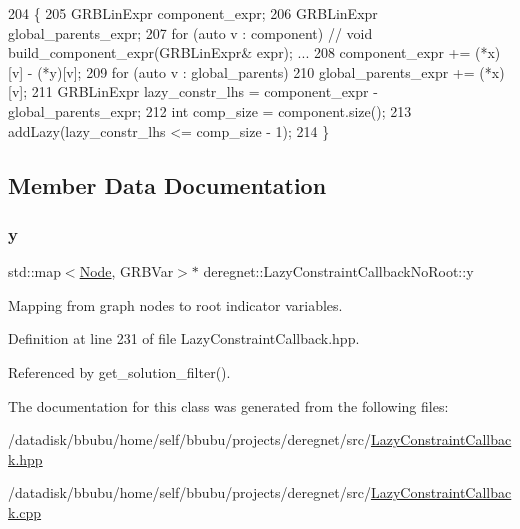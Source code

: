 \begin{DoxyCode}
204                                                                                            \{
205     GRBLinExpr component\_expr;
206     GRBLinExpr global\_parents\_expr;
207     \textcolor{keywordflow}{for} (\textcolor{keyword}{auto} v : component)                      \textcolor{comment}{// void build\_component\_expr(GRBLinExpr& expr); ...}
208         component\_expr += (*x)[v] - (*y)[v];
209     \textcolor{keywordflow}{for} (\textcolor{keyword}{auto} v : global\_parents)
210         global\_parents\_expr += (*x)[v];
211     GRBLinExpr lazy\_constr\_lhs = component\_expr - global\_parents\_expr;
212     \textcolor{keywordtype}{int} comp\_size = component.size();
213     addLazy(lazy\_constr\_lhs <= comp\_size - 1);
214 \}
\end{DoxyCode}


\subsection{Member Data Documentation}
\mbox{\label{classderegnet_1_1LazyConstraintCallbackNoRoot_aaa32cd3d5b65d1c41174cbc9a120ab64}} 
\subsubsection{\texorpdfstring{y}{y}}
{\footnotesize\ttfamily std\+::map$<$\hyperlink{namespacederegnet_a744bad34f2de9856d36715a445f027f3}{Node}, G\+R\+B\+Var$>$$\ast$ deregnet\+::\+Lazy\+Constraint\+Callback\+No\+Root\+::y\hspace{0.3cm}{\ttfamily [private]}}



Mapping from graph nodes to root indicator variables. 



Definition at line 231 of file Lazy\+Constraint\+Callback.\+hpp.



Referenced by get\+\_\+solution\+\_\+filter().



The documentation for this class was generated from the following files\+:\begin{DoxyCompactItemize}
\item 
/datadisk/bbubu/home/self/bbubu/projects/deregnet/src/\hyperlink{LazyConstraintCallback_8hpp}{Lazy\+Constraint\+Callback.\+hpp}\item 
/datadisk/bbubu/home/self/bbubu/projects/deregnet/src/\hyperlink{LazyConstraintCallback_8cpp}{Lazy\+Constraint\+Callback.\+cpp}\end{DoxyCompactItemize}

